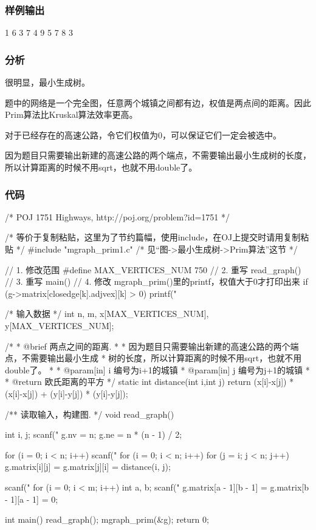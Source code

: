 \subsubsection{样例输出}
\begin{Code}
1 6
3 7
4 9
5 7
8 3
\end{Code}

\subsubsection{分析}
很明显，最小生成树。

题中的网络是一个完全图，任意两个城镇之间都有边，权值是两点间的距离。因此Prim算法比Kruskal算法效率更高。

对于已经存在的高速公路，令它们权值为0，可以保证它们一定会被选中。

因为题目只需要输出新建的高速公路的两个端点，不需要输出最小生成树的长度，所以计算距离的时候不用sqrt，也就不用double了。

\subsubsection{代码}
\begin{Codex}[label=poj_1751_highways_prim.c]
/* POJ 1751 Highways, http://poj.org/problem?id=1751 */

/* 等价于复制粘贴，这里为了节约篇幅，使用include，在OJ上提交时请用复制粘贴 */
#include "mgraph_prim1.c"  /* 见“图->最小生成树->Prim算法”这节 */

// 1. 修改范围
#define MAX_VERTICES_NUM 750
// 2. 重写 read_graph()
// 3. 重写 main()
// 4. 修改 mgraph_prim()里的printf，权值大于0才打印出来
if (g->matrix[closedge[k].adjvex][k] > 0)
    printf("%

/* 输入数据 */
int n, m, x[MAX_VERTICES_NUM], y[MAX_VERTICES_NUM];

/*
 * @brief 两点之间的距离.
 *
 * 因为题目只需要输出新建的高速公路的两个端点，不需要输出最小生成
 * 树的长度，所以计算距离的时候不用sqrt，也就不用double了。
 *
 * @param[in] i 编号为i+1的城镇
 * @param[in] j 编号为j+1的城镇
 *
 * @return 欧氏距离的平方
 */
static int distance(int i,int j) {
    return (x[i]-x[j]) * (x[i]-x[j]) + (y[i]-y[j]) * (y[i]-y[j]);
}

/** 读取输入，构建图. */
void read_graph() {
    int i, j;
    scanf("%
    g.nv = n;
    g.ne = n * (n - 1) / 2;

    for (i = 0; i < n; i++)
        scanf("%
    for (i = 0; i < n; i++)
        for (j = i; j < n; j++)
            g.matrix[i][j] = g.matrix[j][i] = distance(i, j);

    scanf("%
    for (i = 0; i < m; i++) {
        int a, b;
        scanf("%
        g.matrix[a - 1][b - 1] = g.matrix[b - 1][a - 1] = 0;
    }
}

int main() {
    read_graph();
    mgraph_prim(&g);
    return 0;
}
\end{Codex}

